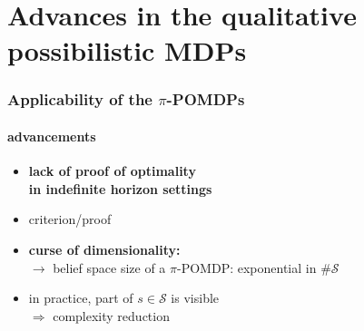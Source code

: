 \documentclass[12pt,svgnames,table]{beamer}
\begin{document}
\section[advancements in $\pi$-POMDP]{Advances in the qualitative possibilistic MDPs}%
\begin{frame}
\frametitle{Applicability of the $\pi$-POMDPs}
\framesubtitle{\footnotesize advancements}
\vspace{0.2cm}
\begin{itemize}
\item<alert@+> \textbf{lack of proof of optimality\\ 
in indefinite horizon settings}
\item criterion/proof
\end{itemize}
\vspace{0.4cm}
\begin{itemize}
\item<alert@+> \textbf{curse of dimensionality:} \\
$\rightarrow$ belief space size of a $\pi$-POMDP:  exponential in $\# \mathcal{S}$\\
\item in practice, part of $s \in \mathcal{S}$ is visible\\
\hspace{1.7cm} $\Rightarrow$ complexity reduction  
\end{itemize}
\vspace{0.5cm}



\end{frame}
\end{document}
